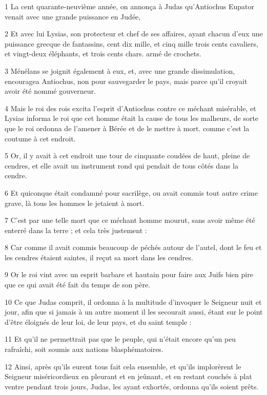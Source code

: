 \par 1 La cent quarante-neuvième année, on annonça à Judas qu'Antiochus Eupator venait avec une grande puissance en Judée,
\par 2 Et avec lui Lysias, son protecteur et chef de ses affaires, ayant chacun d'eux une puissance grecque de fantassins, cent dix mille, et cinq mille trois cents cavaliers, et vingt-deux éléphants, et trois cents chars. armé de crochets.
\par 3 Ménélans se joignit également à eux, et, avec une grande dissimulation, encouragea Antiochus, non pour sauvegarder le pays, mais parce qu'il croyait avoir été nommé gouverneur.
\par 4 Mais le roi des rois excita l'esprit d'Antiochus contre ce méchant misérable, et Lysias informa le roi que cet homme était la cause de tous les malheurs, de sorte que le roi ordonna de l'amener à Bérée et de le mettre à mort. comme c'est la coutume à cet endroit.
\par 5 Or, il y avait à cet endroit une tour de cinquante coudées de haut, pleine de cendres, et elle avait un instrument rond qui pendait de tous côtés dans la cendre.
\par 6 Et quiconque était condamné pour sacrilège, ou avait commis tout autre crime grave, là tous les hommes le jetaient à mort.
\par 7 C'est par une telle mort que ce méchant homme mourut, sans avoir même été enterré dans la terre ; et cela très justement :
\par 8 Car comme il avait commis beaucoup de péchés autour de l'autel, dont le feu et les cendres étaient saintes, il reçut sa mort dans les cendres.
\par 9 Or le roi vint avec un esprit barbare et hautain pour faire aux Juifs bien pire que ce qui avait été fait du temps de son père.
\par 10 Ce que Judas comprit, il ordonna à la multitude d'invoquer le Seigneur nuit et jour, afin que si jamais à un autre moment il les secourait aussi, étant sur le point d'être éloignés de leur loi, de leur pays, et du saint temple :
\par 11 Et qu'il ne permettrait pas que le peuple, qui n'était encore qu'un peu rafraîchi, soit soumis aux nations blasphématoires.
\par 12 Ainsi, après qu'ils eurent tous fait cela ensemble, et qu'ils implorèrent le Seigneur miséricordieux en pleurant et en jeûnant, et en restant couchés à plat ventre pendant trois jours, Judas, les ayant exhortés, ordonna qu'ils soient prêts.
